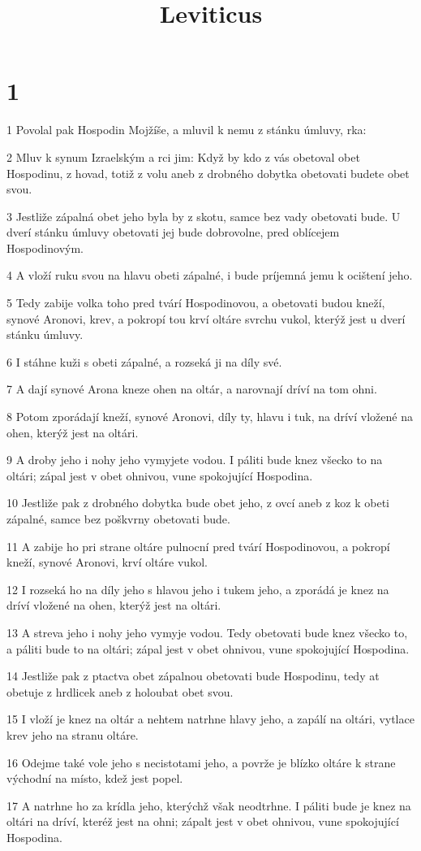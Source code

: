 

\title{Leviticus}

\chapter{1}

\par 1 Povolal pak Hospodin Mojžíše, a mluvil k nemu z stánku úmluvy, rka:
\par 2 Mluv k synum Izraelským a rci jim: Když by kdo z vás obetoval obet Hospodinu, z hovad, totiž z volu aneb z drobného dobytka obetovati budete obet svou.
\par 3 Jestliže zápalná obet jeho byla by z skotu, samce bez vady obetovati bude. U dverí stánku úmluvy obetovati jej bude dobrovolne, pred oblícejem Hospodinovým.
\par 4 A vloží ruku svou na hlavu obeti zápalné, i bude príjemná jemu k ocištení jeho.
\par 5 Tedy zabije volka toho pred tvárí Hospodinovou, a obetovati budou kneží, synové Aronovi, krev, a pokropí tou krví oltáre svrchu vukol, kterýž jest u dverí stánku úmluvy.
\par 6 I stáhne kuži s obeti zápalné, a rozseká ji na díly své.
\par 7 A dají synové Arona kneze ohen na oltár, a narovnají dríví na tom ohni.
\par 8 Potom zporádají kneží, synové Aronovi, díly ty, hlavu i tuk, na dríví vložené na ohen, kterýž jest na oltári.
\par 9 A droby jeho i nohy jeho vymyjete vodou. I páliti bude knez všecko to na oltári; zápal jest v obet ohnivou, vune spokojující Hospodina.
\par 10 Jestliže pak z drobného dobytka bude obet jeho, z ovcí aneb z koz k obeti zápalné, samce bez poškvrny obetovati bude.
\par 11 A zabije ho pri strane oltáre pulnocní pred tvárí Hospodinovou, a pokropí kneží, synové Aronovi, krví oltáre vukol.
\par 12 I rozseká ho na díly jeho s hlavou jeho i tukem jeho, a zporádá je knez na dríví vložené na ohen, kterýž jest na oltári.
\par 13 A streva jeho i nohy jeho vymyje vodou. Tedy obetovati bude knez všecko to, a páliti bude to na oltári; zápal jest v obet ohnivou, vune spokojující Hospodina.
\par 14 Jestliže pak z ptactva obet zápalnou obetovati bude Hospodinu, tedy at obetuje z hrdlicek aneb z holoubat obet svou.
\par 15 I vloží je knez na oltár a nehtem natrhne hlavy jeho, a zapálí na oltári, vytlace krev jeho na stranu oltáre.
\par 16 Odejme také vole jeho s necistotami jeho, a povrže je blízko oltáre k strane východní na místo, kdež jest popel.
\par 17 A natrhne ho za krídla jeho, kterýchž však neodtrhne. I páliti bude je knez na oltári na dríví, kteréž jest na ohni; zápalt jest v obet ohnivou, vune spokojující Hospodina.

